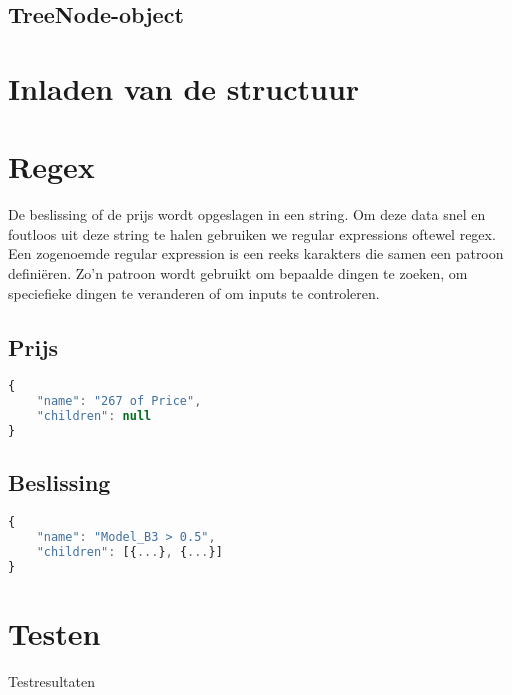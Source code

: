 \subsection{TreeNode-object}

\section{Inladen van de structuur}

\section{Regex}
De beslissing of de prijs wordt opgeslagen in een string. Om deze data snel en foutloos uit deze string te halen gebruiken we regular expressions oftewel regex. Een zogenoemde regular expression is een reeks karakters die samen een patroon definiëren. Zo'n patroon wordt gebruikt om bepaalde dingen te zoeken, om speciefieke dingen te veranderen of om inputs te controleren.\cite{wiki:regex}

\subsection{Prijs}
\begin{lstlisting}[language=JavaScript]
{
    "name": "267 of Price",
    "children": null
}    
\end{lstlisting}
\subsection{Beslissing}

\begin{lstlisting}[language=JavaScript]
{
    "name": "Model_B3 > 0.5",
    "children": [{...}, {...}]
}    
\end{lstlisting}

\section{Testen}
\begin{table}
    \centering
    \caption{Testresultaten}
    \label{tab:test_results}
\end{table}

